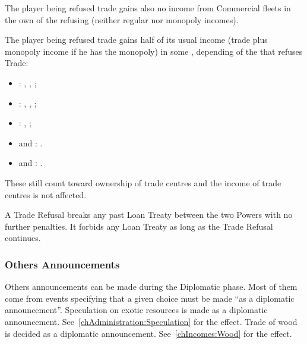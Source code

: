 \bparag The player being refused trade gains also no income from Commercial
fleets in the own \CTZ of the refusing \MAJ (neither regular nor monopoly
incomes).

\bparag The player being refused trade gains half of its usual income (trade
plus monopoly income if he has the monopoly) in some \STZ, depending of the
\MAJ that refuses Trade:
\begin{itemize}
\item \TUR: , , ;
\item \VEN: , , ;
\item \POR: , ;
\item \POL and \SUE: .
\item \HOL and \ENG: .
\end{itemize}

\bparag These \TradeFLEET still count toward ownership of trade centres and
the income of trade centres is not affected.

\aparag A Trade Refusal breaks any past Loan Treaty between the two Powers
with no further penalties. It forbids any Loan Treaty as long as the Trade
Refusal continues.


\subsubsection{Others Announcements}
\aparag Others announcements can be made during the Diplomatic phase.
\bparag Most of them come from events specifying that a given choice must be
made ``as a diplomatic announcement''.
\bparag Speculation on exotic resources is made as a diplomatic
announcement. See~\ref{chAdministration:Speculation} for the effect.
\bparag Trade of wood is decided as a diplomatic
announcement. See~\ref{chIncomes:Wood} for the effect.

